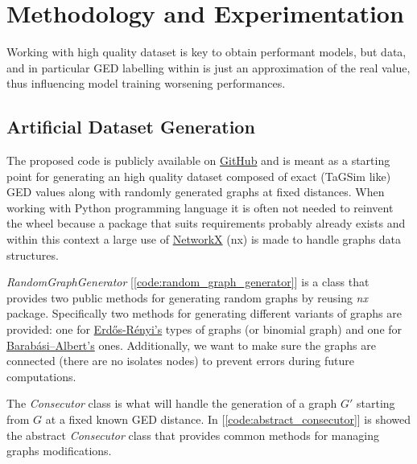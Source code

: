 \documentclass[../Thesis.tex]{subfiles}
\begin{document}
	\section{Methodology and Experimentation}
	\label{sec:methodology_and_experimentation}
	
	Working with high quality dataset is key to obtain performant models, but data, and in particular GED labelling within \cite{computing_graph_edit_distance_via_neural_graph_matching} is just an approximation of the real value, thus influencing model training worsening performances.
	
	
	\subsection{Artificial Dataset Generation}
	\label{sec:artificial_dataset_generation}

	The proposed code is publicly available on \href{https://github.com/FedericoCalabro/gnnged/blob/vldb/1.%20synthetic_dataset_v2.ipynb}{GitHub} and is meant as a starting point for generating an high quality dataset composed of exact (TaGSim like) GED values along with randomly generated graphs at fixed distances.
	When working with Python programming language it is often not needed to reinvent the wheel because a package that suits requirements probably already exists and within this context a large use of \href{https://networkx.org/}{NetworkX} (nx) is made to handle graphs data structures.
	
	
	\textit{RandomGraphGenerator} [\autoref{code:random_graph_generator}] is a class that provides two public methods for generating random graphs by reusing \textit{nx} package. Specifically two methods for generating different variants of graphs are provided: one for \href{https://en.wikipedia.org/wiki/Erd%C5%91s%E2%80%93R%C3%A9nyi_model}{Erdős-Rényi's} types of graphs (or binomial graph) and one for \href{https://en.wikipedia.org/wiki/Barab%C3%A1si%E2%80%93Albert_model}{Barabási–Albert's} ones. Additionally, we want to make sure the graphs are connected (there are no isolates nodes) to prevent errors during future computations. 
	
	
	The \textit{Consecutor} class is what will handle the generation of a graph $G'$ starting from $G$ at a fixed known GED distance. In [\autoref{code:abstract_consecutor}] is showed the abstract \textit{Consecutor} class that provides common methods for managing graphs modifications.
	
\end{document}
